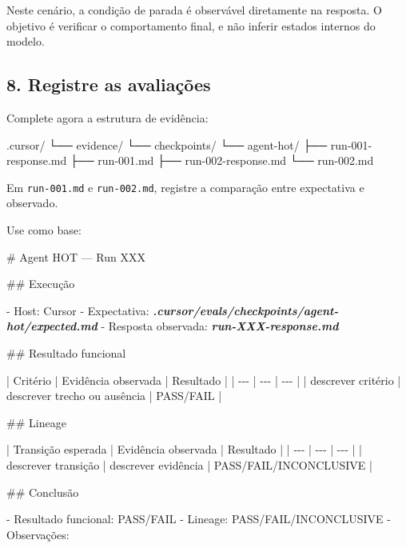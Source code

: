 \documentclass[
  10pt,
  a4paper,
  oneside]{book}
\newenvironment{Shaded}{}{}
\newcommand{\FunctionTok}[1]{\textcolor[rgb]{0.02,0.16,0.49}{#1}}
\newcommand{\InformationTok}[1]{\textcolor[rgb]{0.38,0.63,0.69}{\textbf{\textit{#1}}}}
\newcommand{\NormalTok}[1]{#1}
\newcommand{\SpecialStringTok}[1]{\textcolor[rgb]{0.73,0.40,0.53}{#1}}
\renewenvironment{Shaded}{\begin{snugshade}}{\end{snugshade}}%
\begin{document}
Neste cenário, a condição de parada é observável diretamente na
resposta. O objetivo é verificar o comportamento final, e não inferir
estados internos do modelo.

\hypertarget{registre-as-avaliauxe7uxf5es}{%
\subsection{8. Registre as
avaliações}\label{registre-as-avaliauxe7uxf5es}}

Complete agora a estrutura de evidência:

\begin{Shaded}
\begin{Highlighting}[]
\NormalTok{.cursor/}
\NormalTok{└── evidence/}
\NormalTok{    └── checkpoints/}
\NormalTok{        └── agent{-}hot/}
\NormalTok{            ├── run{-}001{-}response.md}
\NormalTok{            ├── run{-}001.md}
\NormalTok{            ├── run{-}002{-}response.md}
\NormalTok{            └── run{-}002.md}
\end{Highlighting}
\end{Shaded}

Em \texttt{run-001.md} e \texttt{run-002.md}, registre a comparação
entre expectativa e observado.

Use como base:

\begin{Shaded}
\begin{Highlighting}[]
\FunctionTok{\# Agent HOT — Run XXX}

\FunctionTok{\#\# Execução}

\SpecialStringTok{{-} }\NormalTok{Host: Cursor}
\SpecialStringTok{{-} }\NormalTok{Expectativa: }\InformationTok{\textasciigrave{}.cursor/evals/checkpoints/agent{-}hot/expected.md\textasciigrave{}}
\SpecialStringTok{{-} }\NormalTok{Resposta observada: }\InformationTok{\textasciigrave{}run{-}XXX{-}response.md\textasciigrave{}}

\FunctionTok{\#\# Resultado funcional}

\NormalTok{| Critério | Evidência observada | Resultado |}
\NormalTok{| {-}{-}{-} | {-}{-}{-} | {-}{-}{-} |}
\NormalTok{| descrever critério | descrever trecho ou ausência | PASS/FAIL |}

\FunctionTok{\#\# Lineage}

\NormalTok{| Transição esperada | Evidência observada | Resultado |}
\NormalTok{| {-}{-}{-} | {-}{-}{-} | {-}{-}{-} |}
\NormalTok{| descrever transição | descrever evidência | PASS/FAIL/INCONCLUSIVE |}

\FunctionTok{\#\# Conclusão}

\SpecialStringTok{{-} }\NormalTok{Resultado funcional: PASS/FAIL}
\SpecialStringTok{{-} }\NormalTok{Lineage: PASS/FAIL/INCONCLUSIVE}
\SpecialStringTok{{-} }\NormalTok{Observações:}
\end{Highlighting}
\end{Shaded}
\end{document}
